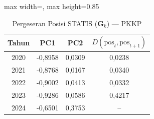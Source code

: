 \begin{table}[H]
\centering
\caption{Pergeseran Posisi STATIS ($\mathbf{G}_k$) --- PKKP} \label{tab:app1jarak_statis_loading_pkkp}
\begin{adjustbox}{max width=\textwidth, max height=0.85\textheight}
\begin{tabular}{|c|c|c|c|}
\hline
\textbf{Tahun} & \textbf{PC1} & \textbf{PC2} & \textbf{$D(\text{pos}_t, \text{pos}_{t+1})$} \\
\hline
2020 & -0,8958 & 0,0309 & 0,0238 \\
2021 & -0,8768 & 0,0167 & 0,0340 \\
2022 & -0,9002 & 0,0413 & 0,0332 \\
2023 & -0,9286 & 0,0586 & 0,4217 \\
2024 & -0,6501 & 0,3753 & -- \\
\hline
\end{tabular}
\end{adjustbox}
\end{table}